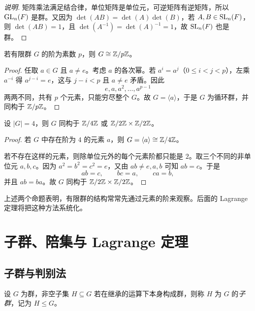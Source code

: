 \begin{proof}[说明]
矩阵乘法满足结合律，单位矩阵是单位元，可逆矩阵有逆矩阵，所以 $\mathrm{GL}_n(F)$ 是群。又因为 $\det(AB)=\det(A)\det(B)$，若 $A,B \in \mathrm{SL}_n(F)$，则 $\det(AB)=1$，且 $\det(A^{-1})=\det(A)^{-1}=1$，故 $\mathrm{SL}_n(F)$ 也是群。
\end{proof}

\begin{proposition}[阶为素数的群是循环群]
若有限群 $G$ 的阶为素数 $p$，则 $G \cong \mathbb{Z}/p\mathbb{Z}$。
\end{proposition}

\begin{proof}
任取 $a\in G$ 且 $a\ne e$。考虑 $a$ 的各次幂。若 $a^i=a^j$（$0\le i<j<p$），左乘 $a^{-i}$ 得 $a^{j-i}=e$，这与 $j-i<p$ 且 $a\ne e$ 矛盾。因此
\[
 e,a,a^2,\dots,a^{p-1}
\]
两两不同，共有 $p$ 个元素，只能穷尽整个 $G$。故 $G=\langle a \rangle$，于是 $G$ 为循环群，并同构于 $\mathbb{Z}/p\mathbb{Z}$。
\end{proof}

\begin{proposition}[阶为 $4$ 的群分类]
设 $|G|=4$，则 $G$ 同构于 $\mathbb{Z}/4\mathbb{Z}$ 或 $\mathbb{Z}/2\mathbb{Z} \times \mathbb{Z}/2\mathbb{Z}$。
\end{proposition}

\begin{proof}
若 $G$ 中存在阶为 $4$ 的元素 $a$，则 $G=\langle a \rangle \cong \mathbb{Z}/4\mathbb{Z}$。

若不存在这样的元素，则除单位元外的每个元素阶都只能是 $2$。取三个不同的非单位元 $a,b,c$。因为 $a^2=b^2=c^2=e$，又由 $ab\ne e,a,b$ 可知 $ab=c$。于是
\[
 ab=c, \qquad bc=a, \qquad ca=b,
\]
并且 $ab=ba$。故 $G$ 同构于 $\mathbb{Z}/2\mathbb{Z} \times \mathbb{Z}/2\mathbb{Z}$。
\end{proof}

\begin{remark}
上述两个命题表明，有限群的结构常常先通过元素的阶来观察。后面的 Lagrange 定理将把这种方法系统化。
\end{remark}

\section{子群、陪集与 Lagrange 定理}

\subsection*{子群与判别法}

\begin{definition}
设 $G$ 为群，非空子集 $H\subseteq G$ 若在继承的运算下本身构成群，则称 $H$ 为 $G$ 的\emph{子群}，记为 $H\le G$。
\end{definition}

